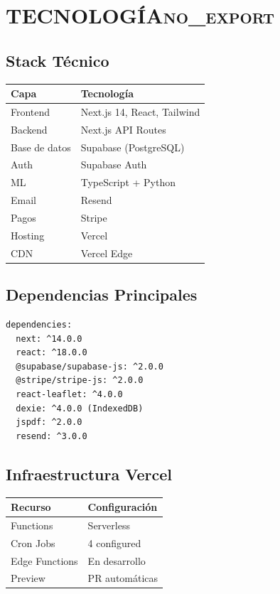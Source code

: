 \documentclass[11pt]{article}
\begin{document}
\section{TECNOLOGÍA\hfill{}\textsc{no\_export}}
\label{sec:org28fae3a}
\subsection{Stack Técnico}
\label{sec:org15b99d1}

\begin{center}
\begin{tabular}{ll}
Capa & Tecnología\\
\hline
Frontend & Next.js 14, React, Tailwind\\
Backend & Next.js API Routes\\
Base de datos & Supabase (PostgreSQL)\\
Auth & Supabase Auth\\
ML & TypeScript + Python\\
Email & Resend\\
Pagos & Stripe\\
Hosting & Vercel\\
CDN & Vercel Edge\\
\end{tabular}
\end{center}

\subsection{Dependencias Principales}
\label{sec:org242b033}

\begin{verbatim}
dependencies:
  next: ^14.0.0
  react: ^18.0.0
  @supabase/supabase-js: ^2.0.0
  @stripe/stripe-js: ^2.0.0
  react-leaflet: ^4.0.0
  dexie: ^4.0.0 (IndexedDB)
  jspdf: ^2.0.0
  resend: ^3.0.0
\end{verbatim}

\subsection{Infraestructura Vercel}
\label{sec:orga0153a5}

\begin{center}
\begin{tabular}{ll}
Recurso & Configuración\\
\hline
Functions & Serverless\\
Cron Jobs & 4 configured\\
Edge Functions & En desarrollo\\
Preview & PR automáticas\\
\end{tabular}
\end{center}
\end{document}
